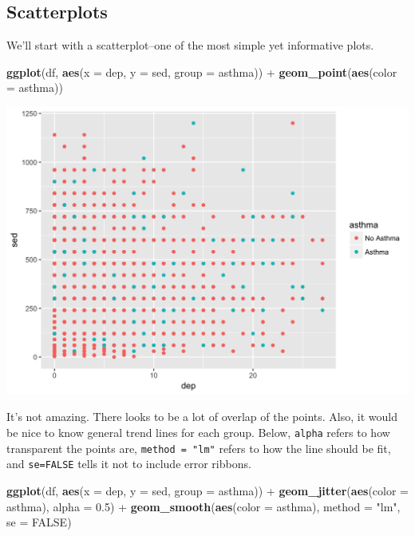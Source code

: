 \documentclass[]{tufte-book}
\newenvironment{Shaded}{}{}
\newcommand{\KeywordTok}[1]{\textcolor[rgb]{0.00,0.44,0.13}{\textbf{#1}}}
\newcommand{\DataTypeTok}[1]{\textcolor[rgb]{0.56,0.13,0.00}{#1}}
\newcommand{\FloatTok}[1]{\textcolor[rgb]{0.25,0.63,0.44}{#1}}
\newcommand{\StringTok}[1]{\textcolor[rgb]{0.25,0.44,0.63}{#1}}
\newcommand{\OtherTok}[1]{\textcolor[rgb]{0.00,0.44,0.13}{#1}}
\newcommand{\OperatorTok}[1]{\textcolor[rgb]{0.40,0.40,0.40}{#1}}
\newcommand{\NormalTok}[1]{#1}
\theoremstyle{definition}
\theoremstyle{definition}
\theoremstyle{remark}
\begin{document}
\subsection*{Scatterplots}\label{scatterplots}

We'll start with a scatterplot--one of the most simple yet informative
plots.

\begin{Shaded}
\begin{Highlighting}[]
\KeywordTok{ggplot}\NormalTok{(df, }\KeywordTok{aes}\NormalTok{(}\DataTypeTok{x =}\NormalTok{ dep, }\DataTypeTok{y =}\NormalTok{ sed, }\DataTypeTok{group =}\NormalTok{ asthma)) }\OperatorTok{+}\StringTok{ }
\StringTok{    }\KeywordTok{geom_point}\NormalTok{(}\KeywordTok{aes}\NormalTok{(}\DataTypeTok{color =}\NormalTok{ asthma))}
\end{Highlighting}
\end{Shaded}

\includegraphics{_main_files/figure-latex/unnamed-chunk-135-1}

It's not amazing. There looks to be a lot of overlap of the points.
Also, it would be nice to know general trend lines for each group.
Below, \texttt{alpha} refers to how transparent the points are,
\texttt{method\ =\ "lm"} refers to how the line should be fit, and
\texttt{se=FALSE} tells it not to include error ribbons.

\begin{Shaded}
\begin{Highlighting}[]
\KeywordTok{ggplot}\NormalTok{(df, }\KeywordTok{aes}\NormalTok{(}\DataTypeTok{x =}\NormalTok{ dep, }\DataTypeTok{y =}\NormalTok{ sed, }\DataTypeTok{group =}\NormalTok{ asthma)) }\OperatorTok{+}\StringTok{ }
\StringTok{    }\KeywordTok{geom_jitter}\NormalTok{(}\KeywordTok{aes}\NormalTok{(}\DataTypeTok{color =}\NormalTok{ asthma), }\DataTypeTok{alpha =} \FloatTok{0.5}\NormalTok{) }\OperatorTok{+}\StringTok{ }
\StringTok{    }\KeywordTok{geom_smooth}\NormalTok{(}\KeywordTok{aes}\NormalTok{(}\DataTypeTok{color =}\NormalTok{ asthma), }\DataTypeTok{method =} \StringTok{"lm"}\NormalTok{, }
        \DataTypeTok{se =} \OtherTok{FALSE}\NormalTok{)}
\end{Highlighting}
\end{Shaded}
\end{document}
